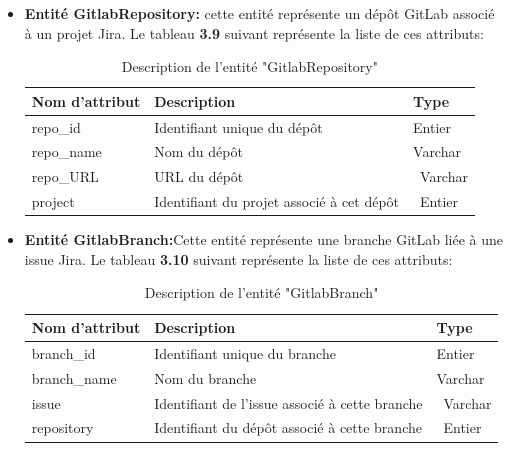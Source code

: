\begin{itemize}
\begin{center}
\begin{longtable}{|p{3cm}|p{11cm}|p{2cm}|}
                \end{longtable}
        \end{center}
        \vspace{-1cm}
        \item \textbf{Entité GitlabRepository:} cette entité représente un dépôt GitLab associé à un projet Jira.
        Le tableau \textbf{3.9} suivant représente la liste de ces attributs:
        \begin{center}   
                \begin{longtable}{|p{3cm}|p{11cm}|p{2cm}|}
                    \caption {Description de l'entité "GitlabRepository"} \\
                    \hline
                    \rowcolor{blue!18}\textbf{\large{Nom d'attribut}} & \textbf{\large{Description}} & \textbf{\large{Type}} \\
                    \hline
                    repo\_id& Identifiant unique du dépôt&  Entier\\\hline
                    repo\_name& Nom du dépôt& Varchar\\\hline
                    repo\_URL& URL du dépôt &\ Varchar\\\hline
                    project& Identifiant du projet associé à cet dépôt&\ Entier\\\hline
                               

                \end{longtable}
        \end{center}
        \vspace{-1cm}
        \item \textbf{Entité GitlabBranch:}Cette entité représente une branche GitLab liée à une issue Jira.
        Le tableau \textbf{3.10} suivant représente la liste de ces attributs:
        \begin{center}   
                \begin{longtable}{|p{3cm}|p{11cm}|p{2cm}|}
                    \caption {Description de l'entité "GitlabBranch"} \\
                    \hline
                    \rowcolor{blue!18}\textbf{\large{Nom d'attribut}} & \textbf{\large{Description}} & \textbf{\large{Type}} \\
                    \hline
                    branch\_id& Identifiant unique du branche&  Entier\\\hline
                    branch\_name& Nom du branche& Varchar\\\hline
                    issue& Identifiant de l'issue associé à cette branche &\ Varchar\\\hline
                    repository & Identifiant du dépôt associé à cette branche&\ Entier\\\hline
                

\end{longtable}
\end{center}
\end{itemize}
